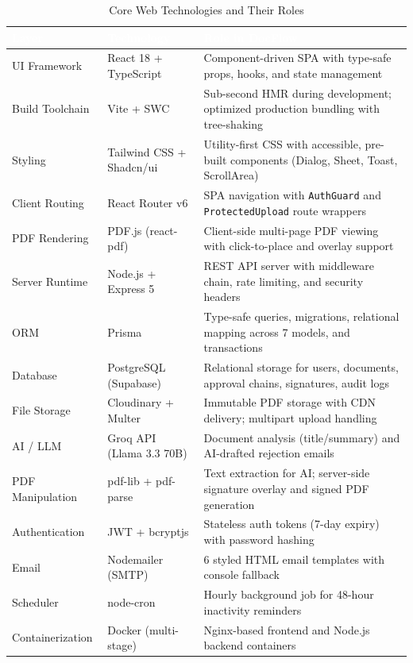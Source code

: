 \documentclass[12pt,a4paper]{report}
\newcommand{\citeref}[1]{%
  \textcolor{citeborder}{%
    \fboxsep=2pt%
    \fcolorbox{citeborder}{citebg}{\footnotesize\bfseries[#1]}%
  }%
}
\begin{document}
\renewcommand{\arraystretch}{1.3}
\begin{table}[H]
\centering
\caption{Core Web Technologies and Their Roles}
\small
\begin{tabularx}{\textwidth}{|p{2.8cm}|p{3.8cm}|X|}
\hline
\rowcolor{headerblue}
\textcolor{white}{\textbf{Layer}} & \textcolor{white}{\textbf{Technology}} & \textcolor{white}{\textbf{Role in DocFlow}} \\
\hline
\rowcolor{rowgray}
UI Framework & React 18 + TypeScript & Component-driven SPA with type-safe props, hooks, and state management \\
\hline
Build Toolchain & Vite + SWC & Sub-second HMR during development; optimized production bundling with tree-shaking \\
\hline
\rowcolor{rowgray}
Styling & Tailwind CSS + Shadcn/ui & Utility-first CSS with accessible, pre-built components (Dialog, Sheet, Toast, ScrollArea) \\
\hline
Client Routing & React Router v6 & SPA navigation with \texttt{AuthGuard} and \texttt{ProtectedUpload} route wrappers \\
\hline
\rowcolor{rowgray}
PDF Rendering & PDF.js (react-pdf) & Client-side multi-page PDF viewing with click-to-place and overlay support \\
\hline
Server Runtime & Node.js + Express 5 & REST API server with middleware chain, rate limiting, and security headers \citeref{4} \\
\hline
\rowcolor{rowgray}
ORM & Prisma & Type-safe queries, migrations, relational mapping across 7 models, and transactions \citeref{3} \\
\hline
Database & PostgreSQL (Supabase) & Relational storage for users, documents, approval chains, signatures, audit logs \citeref{3} \\
\hline
\rowcolor{rowgray}
File Storage & Cloudinary + Multer & Immutable PDF storage with CDN delivery; multipart upload handling \citeref{5} \\
\hline
AI / LLM & Groq API (Llama 3.3 70B) & Document analysis (title/summary) and AI-drafted rejection emails \citeref{2} \\
\hline
\rowcolor{rowgray}
PDF Manipulation & pdf-lib + pdf-parse & Text extraction for AI; server-side signature overlay and signed PDF generation \citeref{8} \\
\hline
Authentication & JWT + bcryptjs & Stateless auth tokens (7-day expiry) with password hashing \\
\hline
\rowcolor{rowgray}
Email & Nodemailer (SMTP) & 6 styled HTML email templates with console fallback \citeref{6} \\
\hline
Scheduler & node-cron & Hourly background job for 48-hour inactivity reminders \citeref{7} \\
\hline
\rowcolor{rowgray}
Containerization & Docker (multi-stage) & Nginx-based frontend and Node.js backend containers \citeref{9} \\
\hline
\end{tabularx}
\end{table}
\end{document}
